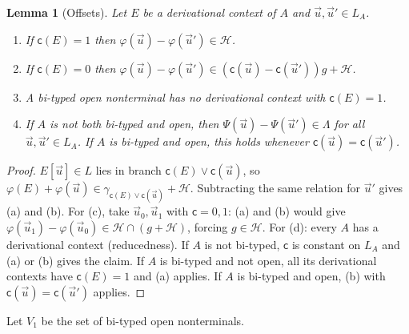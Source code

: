 \documentclass[11pt]{article}
\newtheorem{lemma}[theorem]{Lemma}
\theoremstyle{definition}
\theoremstyle{remark}
\newcommand{\tuple}[1]{\vec{#1}}
\newcommand{\mk}{\mathsf c}
\begin{document}
\begin{lemma}[Offsets]\label{lem:offsets}
Let $E$ be a derivational context of $A$ and $\tuple u,\tuple u'\in L_A$.
\begin{enumerate}[label=(\alph*)]
\item If $\mk(E)=1$ then $\varphi(\tuple u)-\varphi(\tuple u')\in\mathcal H$.
\item If $\mk(E)=0$ then
$\varphi(\tuple u)-\varphi(\tuple u')\in(\mk(\tuple u)-\mk(\tuple u'))g+\mathcal H$.
\item A bi-typed open nonterminal has no derivational context with
$\mk(E)=1$.
\item If $A$ is not both bi-typed and open, then
$\Psi(\tuple u)-\Psi(\tuple u')\in\Lambda$ for all $\tuple u,\tuple u'\in L_A$.
If $A$ is bi-typed and open, this holds whenever
$\mk(\tuple u)=\mk(\tuple u')$.
\end{enumerate}
\end{lemma}
\begin{proof}
$E[\tuple u]\in L$ lies in branch $\mk(E)\vee\mk(\tuple u)$, so
$\varphi(E)+\varphi(\tuple u)\in\gamma_{\mk(E)\vee\mk(\tuple u)}+\mathcal H$.
Subtracting the same relation for $\tuple u'$ gives (a) and (b).  For (c),
take $\tuple u_0,\tuple u_1$ with $\mk=0,1$: (a) and (b) would give
$\varphi(\tuple u_1)-\varphi(\tuple u_0)\in\mathcal H\cap(g+\mathcal H)$,
forcing $g\in\mathcal H$.  For (d): every $A$ has a derivational context
(reducedness).  If $A$ is not bi-typed, $\mk$ is constant on $L_A$ and (a)
or (b) gives the claim.  If $A$ is bi-typed and not open, all its
derivational contexts have $\mk(E)=1$ and (a) applies.  If $A$ is bi-typed
and open, (b) with $\mk(\tuple u)=\mk(\tuple u')$ applies.
\end{proof}

Let $V_1$ be the set of bi-typed open nonterminals.
\end{document}
